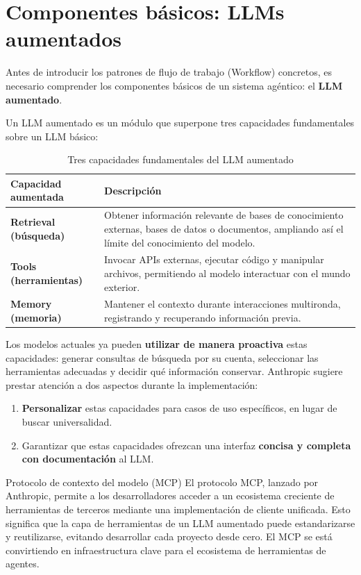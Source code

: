\section{Componentes básicos: LLMs aumentados}

Antes de introducir los patrones de flujo de trabajo (Workflow) concretos, es necesario comprender los componentes básicos de un sistema agéntico: el \textbf{LLM aumentado}.

Un LLM aumentado es un módulo que superpone tres capacidades fundamentales sobre un LLM básico:

\begin{table}[H]
\centering
\begin{tabular}{>{\bfseries}l p{10cm}}
\toprule
Capacidad aumentada & Descripción \\
\midrule
Retrieval (búsqueda) & Obtener información relevante de bases de conocimiento externas, bases de datos o documentos, ampliando así el límite del conocimiento del modelo. \\
Tools (herramientas) & Invocar APIs externas, ejecutar código y manipular archivos, permitiendo al modelo interactuar con el mundo exterior. \\
Memory (memoria) & Mantener el contexto durante interacciones multironda, registrando y recuperando información previa. \\
\bottomrule
\end{tabular}
\caption{Tres capacidades fundamentales del LLM aumentado}
\end{table}

Los modelos actuales ya pueden \textbf{utilizar de manera proactiva} estas capacidades: generar consultas de búsqueda por su cuenta, seleccionar las herramientas adecuadas y decidir qué información conservar. Anthropic sugiere prestar atención a dos aspectos durante la implementación:

\begin{enumerate}
    \item \textbf{Personalizar} estas capacidades para casos de uso específicos, en lugar de buscar universalidad.
    \item Garantizar que estas capacidades ofrezcan una interfaz \textbf{concisa y completa con documentación} al LLM.
\end{enumerate}

\begin{knowledgebox}{Protocolo de contexto del modelo (MCP)}
El protocolo MCP, lanzado por Anthropic, permite a los desarrolladores acceder a un ecosistema creciente de herramientas de terceros mediante una implementación de cliente unificada. Esto significa que la capa de herramientas de un LLM aumentado puede estandarizarse y reutilizarse, evitando desarrollar cada proyecto desde cero. El MCP se está convirtiendo en infraestructura clave para el ecosistema de herramientas de agentes.
\end{knowledgebox}

